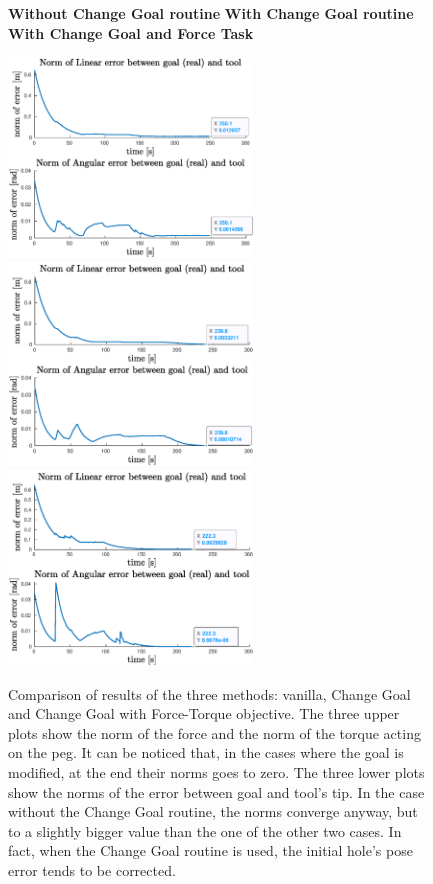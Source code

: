 \begin{figure}[H]
	\vspace{10px}
	\centerline{
		\hspace{5px}
		\textbf{Without Change Goal routine} 
		\hspace{35px}
		\textbf{With Change Goal routine}
		\hspace{25px}
		\textbf{With Change Goal and Force Task} 
	}
	\centerline{
		\includegraphics[width=6.5cm]{error_nothing/error.eps}
		\includegraphics[width=6.5cm]{error_goal/errorNorm.eps}
		\includegraphics[width=6.5cm]{error_all/errorNorm.eps}
	}
	\vspace{10px}
	\caption[Plots of comparisons with and without Change Goal and Force objective]{Comparison of results of the three methods: vanilla, Change Goal and Change Goal with Force-Torque objective. The three upper plots show the norm of the force and the norm of the torque acting on the peg. It can be noticed that, in the cases where the goal is modified, at the end their norms goes to zero. The three lower plots show the norms of the error between goal and tool's tip. In the case without the Change Goal routine, the norms converge anyway, but to a slightly bigger value than the one of the other two cases. In fact, when the Change Goal routine is used, the initial hole's pose error tends to be corrected.}
	\label{fig:comparison_final}
\end{figure}

